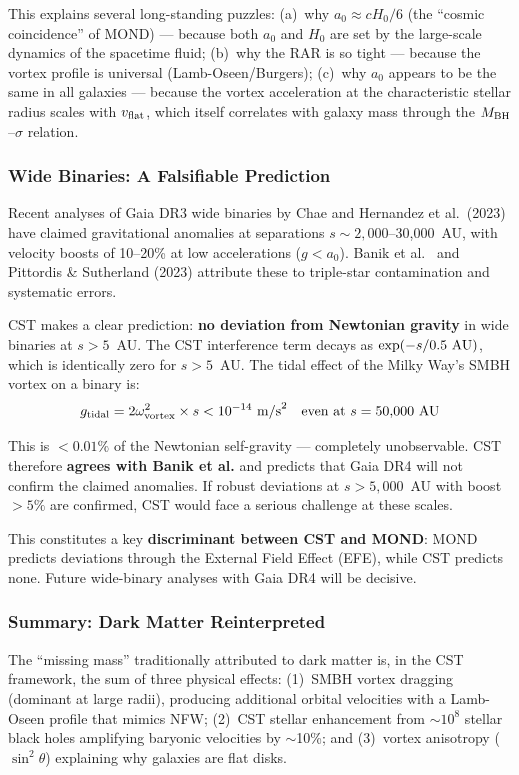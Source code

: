 \documentclass[10pt,a4paper]{article}
\begin{document}
This explains several long-standing puzzles: (a)~why $a_0 \approx cH_0/6$ (the ``cosmic coincidence'' of MOND) --- because both $a_0$ and $H_0$ are set by the large-scale dynamics of the spacetime fluid; (b)~why the RAR is so tight --- because the vortex profile is universal (Lamb-Oseen/Burgers); (c)~why $a_0$ appears to be the same in all galaxies --- because the vortex acceleration at the characteristic stellar radius scales with $v_{\rm flat}$, which itself correlates with galaxy mass through the $M_{\rm BH}$--$\sigma$ relation.

\subsubsection{Wide Binaries: A Falsifiable Prediction}

Recent analyses of Gaia DR3 wide binaries by Chae \cite{Chae2024} and Hernandez et al.\ (2023) have claimed gravitational anomalies at separations $s \sim 2{,}000$--30{,}000~AU, with velocity boosts of 10--20\% at low accelerations ($g < a_0$). Banik et al.\ \cite{Banik2024} and Pittordis \& Sutherland (2023) attribute these to triple-star contamination and systematic errors.

CST makes a clear prediction: \textbf{no deviation from Newtonian gravity} in wide binaries at $s > 5$~AU. The CST interference term decays as $\exp(-s/0.5~{\rm AU})$, which is identically zero for $s > 5$~AU. The tidal effect of the Milky Way's SMBH vortex on a binary is:
\[g_{\rm tidal} = 2\omega_{\rm vortex}^2 \times s < 10^{-14}~{\rm m/s}^2 \quad \text{even at } s = 50{,}000~{\rm AU}\]

This is $< 0.01\%$ of the Newtonian self-gravity --- completely unobservable. CST therefore \textbf{agrees with Banik et al.} and predicts that Gaia DR4 will not confirm the claimed anomalies. If robust deviations at $s > 5{,}000$~AU with boost $> 5\%$ are confirmed, CST would face a serious challenge at these scales.

This constitutes a key \textbf{discriminant between CST and MOND}: MOND predicts deviations through the External Field Effect (EFE), while CST predicts none. Future wide-binary analyses with Gaia DR4 will be decisive.

\subsubsection{Summary: Dark Matter Reinterpreted}

The ``missing mass'' traditionally attributed to dark matter is, in the CST framework, the sum of three physical effects: (1)~SMBH vortex dragging (dominant at large radii), producing additional orbital velocities with a Lamb-Oseen profile that mimics NFW; (2)~CST stellar enhancement from $\sim 10^8$ stellar black holes amplifying baryonic velocities by $\sim$10\%; and (3)~vortex anisotropy ($\sin^2\theta$) explaining why galaxies are flat disks.
\end{document}
